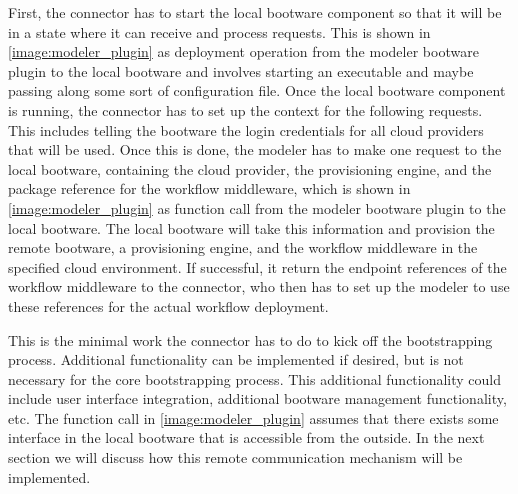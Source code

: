 First, the connector has to start the local bootware component so that it will be in a state where it can receive and process requests.
This is shown in \autoref{image:modeler_plugin} as deployment operation from the modeler bootware plugin to the local bootware and involves starting an executable and maybe passing along some sort of configuration file.
Once the local bootware component is running, the connector has to set up the context for the following requests.
This includes telling the bootware the login credentials for all cloud providers that will be used.
Once this is done, the modeler has to make one request to the local bootware, containing the cloud provider, the provisioning engine, and the package reference for the workflow middleware, which is shown in \autoref{image:modeler_plugin} as function call from the modeler bootware plugin to the local bootware.
The local bootware will take this information and provision the remote bootware, a provisioning engine, and the workflow middleware in the specified cloud environment.
If successful, it return the endpoint references of the workflow middleware to the connector, who then has to set up the modeler to use these references for the actual workflow deployment.

This is the minimal work the connector has to do to kick off the bootstrapping process.
Additional functionality can be implemented if desired, but is not necessary for the core bootstrapping process.
This additional functionality could include user interface integration, additional bootware management functionality, etc.
The function call in \autoref{image:modeler_plugin} assumes that there exists some interface in the local bootware that is accessible from the outside.
In the next section we will discuss how this remote communication mechanism will be implemented.
